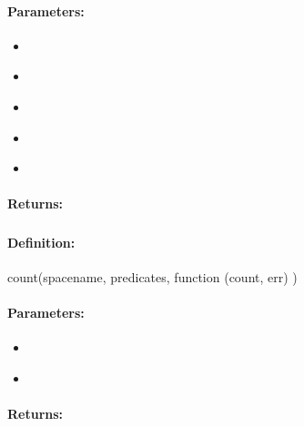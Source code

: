 \paragraph{Parameters:}
\begin{itemize}[noitemsep]
\item {}\\

\item {}\\

\item {}\\

\item {}\\

\item {}\\

\end{itemize}

\paragraph{Returns:}


\pagebreak
\subsubsection{}
\label{api:nodejs:count}


\paragraph{Definition:}
\begin{javascriptcode}
count(spacename, predicates, function (count, err) {})
\end{javascriptcode}
\paragraph{Parameters:}
\begin{itemize}[noitemsep]
\item {}\\

\item {}\\

\end{itemize}

\paragraph{Returns:}

